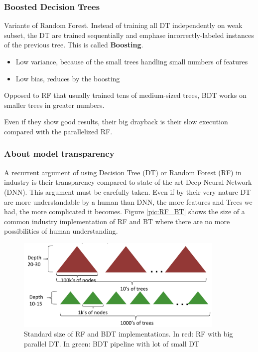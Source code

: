 \subsubsection{Boosted Decision Trees}
Variante of Random Forest. Instead of training all DT independently on weak subset, the DT are trained sequentially and emphase incorrectly-labeled instances of the previous tree. This is called \textbf{Boosting}. 
\begin{itemize}
\item Low variance, because of the small trees handling small numbers of features
\item Low bias, reduces by the boosting
\end{itemize}

Opposed to RF that usually trained tens of medium-sized trees, BDT works on smaller trees in greater numbers.

Even if they show good results, their big drayback is their slow execution compared with the parallelized RF.

\subsubsection{About model transparency}

A recurrent argument of using Decision Tree (DT) or Random Forest (RF) in industry is their transparency compared to state-of-the-art Deep-Neural-Network (DNN). This argument must be carefully taken. Even if by their very nature DT are more understandable by a human than DNN, the more features and Trees we had, the more complicated it becomes. Figure \ref{pic:RF_BT} shows the size of a common industry implementation of RF and BT where there are no more possibilities of human understanding.

\begin{figure}[H]%
 \centering
 \includegraphics[width=10cm]{./img/07/RF_BT.png}
 \caption{\label{pic:RF_BT.} Standard size of RF and BDT implementations.
 In red: RF with big parallel DT. In green: BDT pipeline with lot of small DT}
\end{figure}


